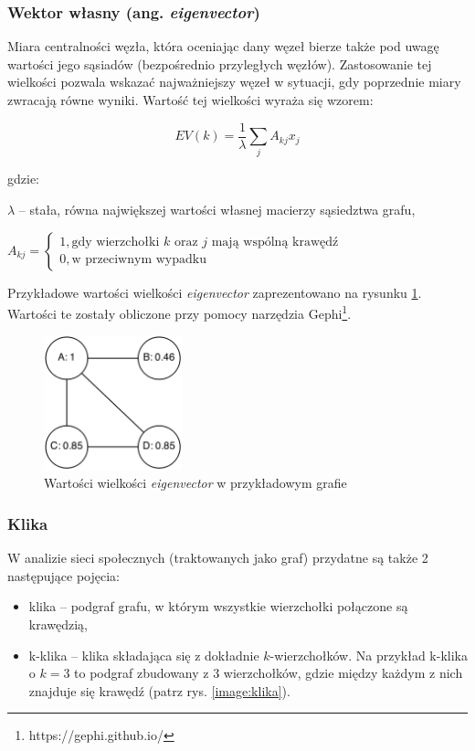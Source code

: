 \clearpage
\subsubsection{Wektor własny (ang. \textit{eigenvector})}
Miara centralności węzła,  która oceniając dany węzeł bierze także pod uwagę 
wartości jego sąsiadów (bezpośrednio przyległych węzłów).
Zastosowanie tej wielkości pozwala wskazać najważniejszy węzeł w sytuacji,
gdy poprzednie miary zwracają równe wyniki. Wartość tej wielkości wyraża się
wzorem:

\begin{equation}
EV(k) = \frac{1}{\lambda}\sum\limits_{j}A_{kj}x_j
\end{equation}

gdzie:

$\lambda$ -- stała, równa największej wartości własnej macierzy sąsiedztwa grafu,

\begin{math}
 A_{kj} =
  \begin{cases}
   1, \text{gdy wierzchołki $k$ oraz $j$ mają wspólną krawędź} \\
   0, \text{w przeciwnym wypadku}
  \end{cases}

\end{math}


\bigskip

Przykładowe wartości wielkości \textit{eigenvector}
zaprezentowano na rysunku \ref{image:eigenvector}. Wartości te zostały
obliczone przy pomocy narzędzia Gephi\footnote{https://gephi.github.io/}.

\begin{figure}[ht!]
\centering
\includegraphics[width=40mm]{img/eigenvector.png}
\caption{Wartości wielkości \textit{eigenvector} w przykładowym grafie}
\label{image:eigenvector}
\end{figure}


\subsubsection{Klika}
W analizie sieci społecznych (traktowanych jako graf) przydatne są także 
2 następujące pojęcia:
\begin{itemize}
  \item klika -- podgraf grafu, w którym wszystkie wierzchołki połączone są 
  krawędzią,
  \item k-klika -- klika składająca się z dokładnie $k$-wierzchołków. Na przykład
  k-klika o $k=3$ to podgraf zbudowany z 3 wierzchołków, gdzie między każdym z 
  nich znajduje się krawędź (patrz rys. \ref{image:klika}).
\end{itemize}

